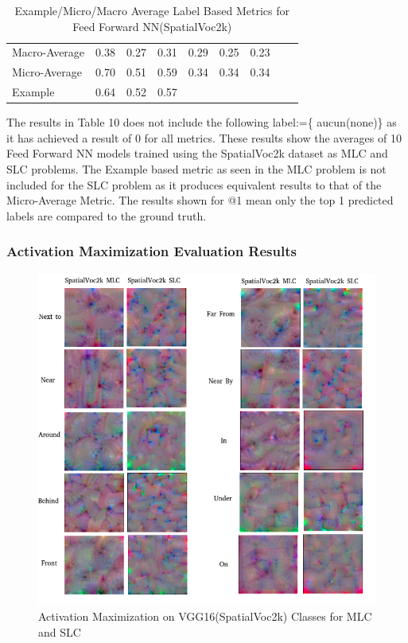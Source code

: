 \documentclass{csfyp}
\begin{document}
\begin{table}[!htbp]
\begin{tabular}{|l|l|l|l|l|l|l|l|l}
Macro-Average &	0.38	&	0.27	&	0.31	&	0.29	&	0.25	&	0.23\\ \cline{1-7}
Micro-Average &	0.70	&	0.51	&	0.59	&	0.34	&	0.34	&	0.34 \\ \cline{1-7}
Example       &	0.64	&	0.52	&	0.57 \\ \cline{1-4}
\end{tabular}
\caption{Example/Micro/Macro Average Label Based Metrics for Feed Forward NN(SpatialVoc2k)}
The results in Table 10 does not include the following label:=\{ aucun(none)\} as it has achieved a result of 0 for all metrics. These results show the averages of 10 Feed Forward NN models trained using the SpatialVoc2k dataset as MLC and SLC problems. The Example based metric as seen in the MLC problem is not included for the SLC problem as it produces equivalent results to that of the Micro-Average Metric. The results shown for @1 mean only the top 1 predicted labels are compared to the ground truth.
\vspace{-4mm}
\end{table}


\newpage
\subsubsection{Activation Maximization Evaluation Results}

\begin{figure}[!htbp]
	\includegraphics[scale=0.60,center]{Spatial_act.pdf}
	\caption{Activation Maximization on VGG16(SpatialVoc2k) Classes for MLC and SLC}
\end{figure}
\end{document}
